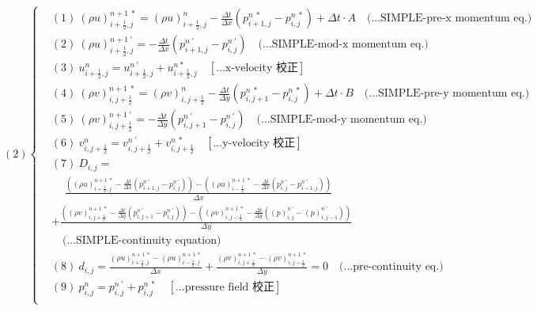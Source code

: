 \documentclass[12pt]{article}
\begin{document}
\begin{equation}
(2)
\left\{
\begin{aligned}
    &(1)\ (\rho u)_{i+\frac{1}{2},j}^{n+1\ *} = (\rho u)_{i+\frac{1}{2},j}^{n} - \frac{\Delta t}{\Delta x}(p_{i+1,j}^{n\ *} - p_{i,j}^{n\ *}) + \Delta t \cdot A \quad \text{(...SIMPLE-pre-x momentum eq.)}\\[1.5ex]
    &(2)\ (\rho u)_{i+\frac{1}{2},j}^{n+1\ \prime} = - \frac{\Delta t}{\Delta x}(p_{i+1,j}^{n\ \prime} - p_{i,j}^{n\ \prime})  \quad \text{(...SIMPLE-mod-x momentum eq.)}\\[1.5ex]
    &(3)\ u_{i+\frac{1}{2},j}^{n} = u_{i+\frac{1}{2},j}^{n\ '} + u_{i+\frac{1}{2},j}^{n *}  \quad \left[\text{...x-velocity 校正}\right]\\[1.5ex]
    &(4)\ (\rho v)_{i,j+\frac{1}{2}}^{n+1\ *} = (\rho v)_{i,j+\frac{1}{2}}^{n} - \frac{\Delta t}{\Delta y}(p_{i,j+1}^{n\ *} - p_{i,j}^{n\ *}) + \Delta t \cdot B  \quad \text{(...SIMPLE-pre-y momentum eq.)}\\[1.5ex]
    &(5)\ (\rho v)_{i,j+\frac{1}{2}}^{n+1\ \prime} =  - \frac{\Delta t}{\Delta y}(p_{i,j+1}^{n\ \prime} - p_{i,j}^{n\ \prime}) \quad \text{(...SIMPLE-mod-y momentum eq.)}\\[1.5ex]
    &(6)\ v_{i,j+\frac{1}{2}}^{n} = v_{i,j+\frac{1}{2}}^{n\ \prime} + v_{i,j+\frac{1}{2}}^{n\ *} \quad \left[\text{...y-velocity 校正}\right]\\[1.5ex]
    &(7)\ D_{i,j} =\\[1.5ex]
        &\quad \ \frac{((\rho u)_{i+\frac{1}{2},j}^{n+1\ *} - \frac{\Delta t}{\Delta x}(p_{i+1,j}^{n\ \prime} - p_{i,j}^{n\ \prime})) - ((\rho u)_{i-\frac{1}{2}}^{n+1\ *} - \frac{\Delta t}{\Delta x}(p_{i,j}^{n\ \prime} - p_{i-1,j}^{n\ \prime})) }{\Delta x}\\[1.5ex]
        &+\frac{((\rho v)_{i,j+\frac{1}{2}}^{n+1\ *}- \frac{\Delta t}{\Delta y}(p_{i,j+1}^{n\ \prime} - p_{i,j}^{n\ \prime})) - ((\rho v)_{i,j-\frac{1}{2}}^{n+1\ *}-\frac{\Delta t}{\Delta y}((p)_{i,j}^{n\ \prime} - (p)_{i,j-1}^{n\ \prime}))}{\Delta y}\\[1.5ex]
        &\quad \text{(...SIMPLE-continuity equation)}\\[1.5ex]
    &(8)\ d_{i,j} = \frac{(\rho u)_{i+\frac{1}{2},j}^{n+1\ *} - (\rho u)_{i-\frac{1}{2},j}^{n+1\ *}}{\Delta x} + \frac{(\rho v)_{i,j+\frac{1}{2}}^{n+1\ *} - (\rho v)_{i,j-\frac{1}{2}}^{n+1\ *}}{\Delta y} = 0 \quad \text{(...pre-continuity eq.)}\\[1.5ex]
    &(9)\ p_{i,j}^{n} = p_{i,j}^{n\ \prime} + p_{i,j}^{n\ *} \quad\left[\text{...pressure field 校正}\right]\\[1.5ex]
\end{aligned}
\right.
\end{equation}
\end{document}
